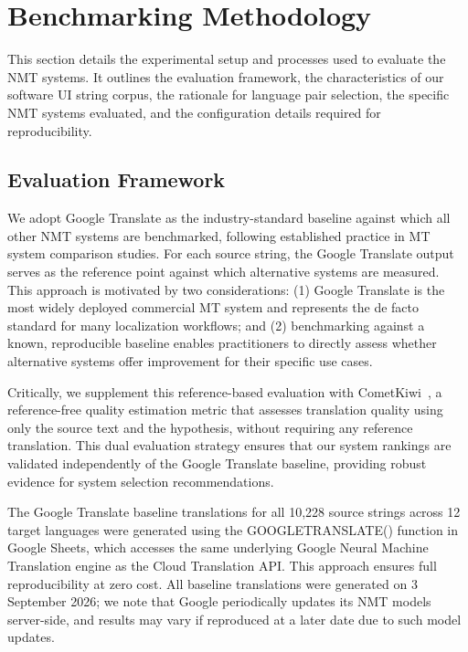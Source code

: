 \documentclass[pdflatex,sn-mathphys-num]{sn-jnl}
\begin{document}
\section{Benchmarking Methodology}

This section details the experimental setup and processes used to evaluate the NMT systems. It outlines the evaluation framework, the characteristics of our software UI string corpus, the rationale for language pair selection, the specific NMT systems evaluated, and the configuration details required for reproducibility.

\subsection{Evaluation Framework}

We adopt Google Translate as the industry-standard baseline against which all other NMT systems are benchmarked, following established practice in MT system comparison studies. For each source string, the Google Translate output serves as the reference point against which alternative systems are measured. This approach is motivated by two considerations: (1) Google Translate is the most widely deployed commercial MT system and represents the de facto standard for many localization workflows; and (2) benchmarking against a known, reproducible baseline enables practitioners to directly assess whether alternative systems offer improvement for their specific use cases.

Critically, we supplement this reference-based evaluation with CometKiwi~\cite{28}, a reference-free quality estimation metric that assesses translation quality using only the source text and the hypothesis, without requiring any reference translation. This dual evaluation strategy ensures that our system rankings are validated independently of the Google Translate baseline, providing robust evidence for system selection recommendations.

The Google Translate baseline translations for all 10,228 source strings across 12 target languages were generated using the GOOGLETRANSLATE() function in Google Sheets, which accesses the same underlying Google Neural Machine Translation engine as the Cloud Translation API. This approach ensures full reproducibility at zero cost. All baseline translations were generated on 3 September 2026; we note that Google periodically updates its NMT models server-side, and results may vary if reproduced at a later date due to such model updates.
\end{document}
